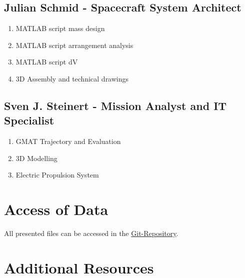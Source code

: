 \documentclass[conference]{IEEEtran}
\begin{document}
\subsection{Julian Schmid - Spacecraft System Architect}
\begin{enumerate}
    \item MATLAB script mass design
    \item MATLAB script arrangement analysis
    \item MATLAB script dV
    \item 3D Assembly and technical drawings
\end{enumerate}
\subsection{Sven J. Steinert - Mission Analyst and IT Specialist}
\begin{enumerate}
    \item GMAT Trajectory and Evaluation
    \item 3D Modelling
    \item Electric Propulsion System
\end{enumerate}

\section{Access of Data}
All presented files can be accessed in the \href{https://github.com/Sven-J-Steinert/MomenTUM}{Git-Repository}.








%
\newpage









\newpage

\appendices
\section{Additional Resources}
\label{Appendix}
\end{document}
